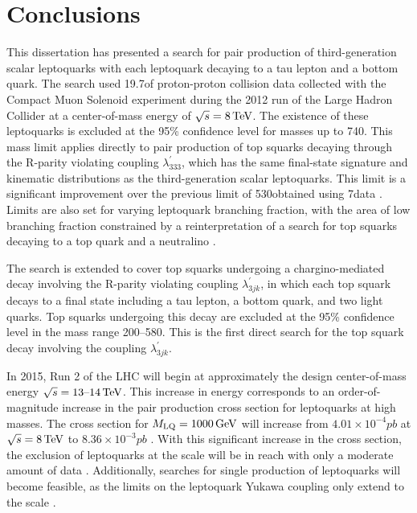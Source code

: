 \documentclass[12pt]{thesis}  %
\newcommand{\MLQ}{\ensuremath{M_{\text{LQ}}}\xspace}
\begin{document}
\chapter{Conclusions
\label{ch:conclusions}}

This dissertation has presented a search for pair production of third-generation scalar leptoquarks with each leptoquark decaying to a tau lepton and a bottom quark. The search used 19.7\fbinv of proton-proton collision data collected with the Compact Muon Solenoid experiment during the 2012 run of the Large Hadron Collider at a center-of-mass energy of $\sqrt{s}=8\,\text{Te\hspace{-.08em}V}$. The existence of these leptoquarks is excluded at the 95\% confidence level for masses up to 740\GeV. This mass limit applies directly to pair production of top squarks decaying through the R-parity violating coupling $\lambda^{\prime}_{333}$, which has the same final-state signature and kinematic distributions as the third-generation scalar leptoquarks. This limit is a significant improvement over the previous limit of 530\GeV obtained using 7\TeV data \cite{CMSLQ3,ATLASLQ3}. Limits are also set for varying leptoquark branching fraction, with the area of low branching fraction constrained by a reinterpretation of a search for top squarks decaying to a top quark and a neutralino \cite{SUS-13-011}. 

The search is extended to cover top squarks undergoing a chargino-mediated decay involving the R-parity violating coupling $\lambda^{\prime}_{3jk}$, in which each top squark decays to a final state including a tau lepton, a bottom quark, and two light quarks. Top squarks undergoing this decay are excluded at the 95\% confidence level in the mass range 200--580\GeV. This is the first direct search for the top squark decay involving the coupling $\lambda^{\prime}_{3jk}$.

In 2015, Run 2 of the LHC will begin at approximately the design center-of-mass energy $\sqrt{s}=13\text{--}14\,\text{Te\hspace{-.08em}V}$. This increase in energy corresponds to an order-of-magnitude increase in the pair production cross section for leptoquarks at high masses. The cross section for $\MLQ=1000\GeV$ will increase from $4.01\times10^{-4}\unit{pb}$ at $\sqrt{s}=8\,\text{Te\hspace{-.08em}V}$ to $8.36\times10^{-3}\unit{pb}$ \cite{LQxsec}. With this significant increase in the cross section, the exclusion of leptoquarks at the \TeVns scale will be in reach with only a moderate amount of data \cite{LQPairHad}. Additionally, searches for single production of leptoquarks will become feasible, as the limits on the leptoquark Yukawa coupling only extend to the \TeVns scale \cite{Leurer:1993em, MuchAdo, LQreview}.
\end{document}
